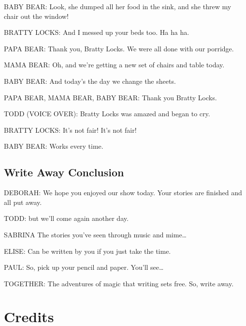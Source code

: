 BABY BEAR:
Look, she dumped all her food in the sink, and she threw my chair out the window!

BRATTY LOCKS:
And I messed up your beds too.
Ha ha ha.

PAPA BEAR:
Thank you, Bratty Locks. We were all done with our porridge.

MAMA BEAR:
Oh, and we're getting a new set of chairs and table today.

BABY BEAR:
And today's the day we change the sheets.

PAPA BEAR, MAMA BEAR, BABY BEAR:
Thank you Bratty Locks.

TODD (VOICE OVER):
Bratty Locks was amazed and began to cry.

BRATTY LOCKS:
It's not fair! It's not fair!

BABY BEAR:
Works every time.

\subsection{Write Away Conclusion}

DEBORAH:
We hope you enjoyed our show today.
Your stories are finished and all put away.

TODD:
but we'll come again another day.

SABRINA
The stories you've seen through music and mime\dots

ELISE:
Can be written by you if you just take the time.

PAUL:
So, pick up your pencil and paper. You'll see\dots

TOGETHER:
The adventures of magic that writing sets free.
So, write away.

\section{Credits}